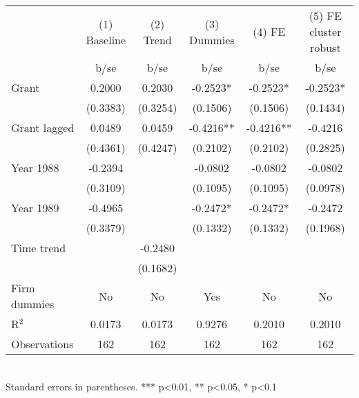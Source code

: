 \begin{tabular}{lccccc}\hline
                    &(1) Baseline   &   (2) Trend   & (3) Dummies   &      (4) FE   &(5) FE cluster robust   \\
                    &        b/se   &        b/se   &        b/se   &        b/se   &        b/se   \\
\hline
Grant               &      0.2000   &      0.2030   &     -0.2523*  &     -0.2523*  &     -0.2523*  \\
                    &    (0.3383)   &    (0.3254)   &    (0.1506)   &    (0.1506)   &    (0.1434)   \\
Grant lagged        &      0.0489   &      0.0459   &     -0.4216** &     -0.4216** &     -0.4216   \\
                    &    (0.4361)   &    (0.4247)   &    (0.2102)   &    (0.2102)   &    (0.2825)   \\
Year 1988           &     -0.2394   &               &     -0.0802   &     -0.0802   &     -0.0802   \\
                    &    (0.3109)   &               &    (0.1095)   &    (0.1095)   &    (0.0978)   \\
Year 1989           &     -0.4965   &               &     -0.2472*  &     -0.2472*  &     -0.2472   \\
                    &    (0.3379)   &               &    (0.1332)   &    (0.1332)   &    (0.1968)   \\
Time trend          &               &     -0.2480   &               &               &               \\
                    &               &    (0.1682)   &               &               &               \\
Firm dummies        &          No   &          No   &         Yes   &          No   &          No   \\
\hline
R$^2$               &      0.0173   &      0.0173   &      0.9276   &      0.2010   &      0.2010   \\
Observations        &         162   &         162   &         162   &         162   &         162   \\
\hline\end{tabular}\\Standard errors in parentheses. *** p<0.01, ** p<0.05, * p<0.1
